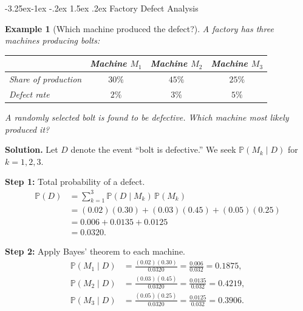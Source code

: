 \documentclass{article}
\makeatletter
\newtheorem{example}{Example}[section]
\theoremstyle{remark}
\newlength{\subsecindent}
\renewcommand\subsection{\@startsection{subsection}{2}{\subsecindent}%
  {-3.25ex\@plus -1ex \@minus -.2ex}%
  {1.5ex \@plus .2ex}%
  {\normalfont\large\bfseries}}
\newenvironment{sub}{%
  \begin{list}{}{%
    \setlength{\leftmargin}{4em}%
    \setlength{\rightmargin}{0pt}%
    \setlength{\topsep}{0pt}%
    \setlength{\partopsep}{0pt}%
    \setlength{\parsep}{\parskip}%
    \setlength{\itemsep}{\parskip}%
  }\item\relax
}{\end{list}}
\newcommand{\Prob}{\mathbb{P}}
\newcommand{\given}{\mid}
\makeatother
\begin{document}
\subsection{Factory Defect Analysis}
\label{sec:factory}
\begin{sub}

\begin{example}[Which machine produced the defect?]
  \label{ex:factory}
  A factory has three machines producing bolts:

  \begin{center}
    \begin{tabular}{lccc}
      \toprule
      & Machine $M_1$ & Machine $M_2$ & Machine $M_3$ \\
      \midrule
      Share of production & $30\%$ & $45\%$ & $25\%$ \\
      Defect rate         & $2\%$  & $3\%$  & $5\%$  \\
      \bottomrule
    \end{tabular}
  \end{center}

  A randomly selected bolt is found to be defective.
  Which machine most likely produced it?
\end{example}

\textbf{Solution.}
Let $D$ denote the event ``bolt is defective.''  We seek
$\Prob(M_k \given D)$ for $k = 1, 2, 3$.

\textbf{Step 1:} Total probability of a defect.
\begin{align*}
  \Prob(D)
    &= \sum_{k=1}^{3} \Prob(D \given M_k)\,\Prob(M_k) \\
    &= (0.02)(0.30) + (0.03)(0.45) + (0.05)(0.25) \\
    &= 0.006 + 0.0135 + 0.0125 \\
    &= 0.0320.
\end{align*}

\textbf{Step 2:} Apply Bayes' theorem to each machine.
\begin{align*}
  \Prob(M_1 \given D)
    &= \frac{(0.02)(0.30)}{0.0320}
     = \frac{0.006}{0.032}
     = 0.1875, \\[4pt]
  \Prob(M_2 \given D)
    &= \frac{(0.03)(0.45)}{0.0320}
     = \frac{0.0135}{0.032}
     = 0.4219, \\[4pt]
  \Prob(M_3 \given D)
    &= \frac{(0.05)(0.25)}{0.0320}
     = \frac{0.0125}{0.032}
     = 0.3906.
\end{align*}


\end{sub}
\end{document}
